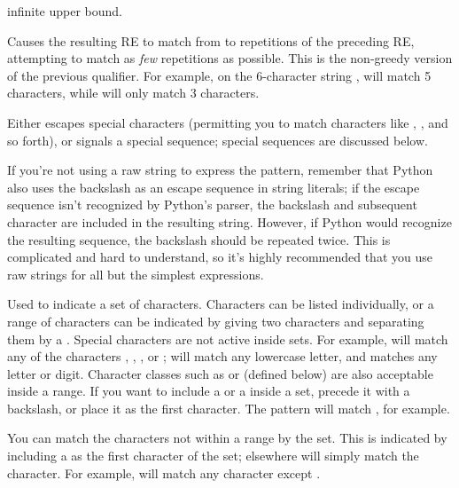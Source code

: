\begin{list}{}{\leftmargin \MyLeftMargin {} \MyLabelWidth}
infinite upper bound. 
%
\item[\code{\{\var{m},\var{n}\}?}] Causes the resulting RE to
match from  to  repetitions of the preceding RE,
attempting to match as \emph{few} repetitions as possible.  This is
the non-greedy version of the previous qualifier.  For example, on the
6-character string ,  will match 5 
characters, while  will only match 3 characters.   
%
\item[\character{\e}] Either escapes special characters (permitting you to match
characters like \character{*}, , and so forth), or
signals a special sequence; special sequences are discussed below.  

If you're not using a raw string to
express the pattern, remember that Python also uses the
backslash as an escape sequence in string literals; if the escape
sequence isn't recognized by Python's parser, the backslash and
subsequent character are included in the resulting string.  However,
if Python would recognize the resulting sequence, the backslash should
be repeated twice.  This is complicated and hard to understand, so
it's highly recommended that you use raw strings for all but the
simplest expressions.
%
\item[\code{[]}] Used to indicate a set of characters.  Characters can
be listed individually, or a range of characters can be indicated by
giving two characters and separating them by a \character{-}.  Special
characters are not active inside sets.  For example, \regexp{[akm\$]}
will match any of the characters , ,
, or \character{\$}; \regexp{[a-z]}
will match any lowercase letter, and \code{[a-zA-Z0-9]} matches any
letter or digit.  Character classes such as  or  (defined below) are also acceptable inside a range.  If you want to
include a \character{]} or a \character{-} inside a set, precede it with a
backslash, or place it as the first character.  The 
pattern \regexp{[]]} will match \code{']'}, for example.  

You can match the characters not within a range by 
the set.  This is indicated by including a
\character{\^} as the first character of the set; \character{\^} elsewhere will
simply match the \character{\^} character.  For example, \regexp{[\^5]}
will match any character except .


\end{list}
